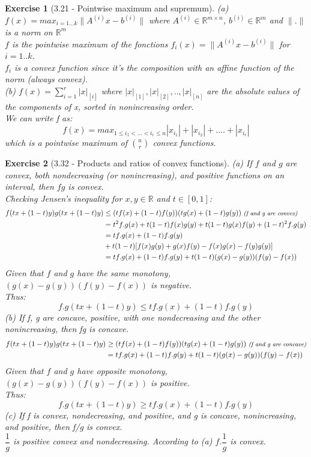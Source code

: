 \documentclass[11pt]{article}
\theoremstyle{exo}
\newtheorem*{exercise}{Exercise}
\newcommand{\R}{\mathbb{R}}
\newcommand{\1}{\mathbf{1}}
\newcommand{\0}{\mathbf{0}}
\begin{document}
\begin{exercise}[3.21 - Pointwise maximum and supremum]
(a) $f(x)=max_{i=1...k}\|A^{(i)}x-b^{(i)}\|$ where $A^{(i)}\in\R^{m\times n}$, $b^{(i)}\in\R^m$ and $\|.\|$ is a norm on $\R^m$\\
$f$ is the pointwise maximum of the fonctions $f_i(x)=\|A^{(i)}x-b^{(i)}\|$ for $i=1..k$.\\
$f_i$ is a convex function since it's the composition with an affine function of the norm (always convex).\\
(b)  $f(x)=\sum\limits_{i=1}^r|x|_{[i]}$ where $|x|_{[1]},|x|_{[2]},..,|x|_{[n]}$ are the absolute values of the components of x, sorted in nonincreasing order.\\
We can write f as:
\[f(x)=max_{1\leq i_1<...<i_r\leq n}|x_{i_1}|+|x_{i_2}|+....+|x_{i_r}|\]
which is a pointwise maximum of $n \choose r$ convex functions.
\end{exercise}

\begin{exercise}[3.32 - Products and ratios of convex functions]
(a) \textit{If $f$ and $g$ are convex, both nondecreasing (or nonincreasing), and positive functions on an interval, then $fg$ is convex.} \\
Checking Jensen's inequality for $x,y\in \R$ and $t\in[0,1]$:
\[
\begin{split}
f(tx+(1-t)y)g(tx+(1-t)y)&\leq(tf(x)+(1-t)f(y))(tg(x)+(1-t)g(y))\text{\footnotesize\textit{    (f and g are convex)}}\\
&=t^2f.g(x)+t(1-t)f(x)g(y)+t(1-t)g(x)f(y)+(1-t)^2f.g(y)\\
&=tf.g(x)+(1-t)f.g(y)\\
&+t(1-t)[f(x)g(y)+g(x)f(y)-f(x)g(x)-f(y)g(y)]\\
&=tf.g(x)+(1-t)f.g(y)+t(1-t)(g(x)-g(y))(f(y)-f(x))
\end{split}
\]
Given that $f$ and $g$ have the same monotony, $(g(x)-g(y))(f(y)-f(x))$ is negative.\\ Thus:
\[
f.g(tx+(1-t)y)\leq tf.g(x)+(1-t)f.g(y) \]
(b) \textit{If f, g are concave, positive, with one nondecreasing and the other nonincreasing, then fg is concave.}\\
\[
\begin{split}
f(tx+(1-t)y)g(tx+(1-t)y)&\geq(tf(x)+(1-t)f(y))(tg(x)+(1-t)g(y))\text{\footnotesize\textit{    (f and g are concave)}}\\
&=tf.g(x)+(1-t)f.g(y)+t(1-t)(g(x)-g(y))(f(y)-f(x))\\
\end{split}
\]
Given that $f$ and $g$ have opposite monotony, $(g(x)-g(y))(f(y)-f(x))$ is positive.\\ Thus:
\[
f.g(tx+(1-t)y)\geq tf.g(x)+(1-t)f.g(y) \]
(c) \textit{If f is convex, nondecreasing, and positive, and g is concave, nonincreasing, and positive, then f/g is convex.}\\
$\dfrac{1}{g}$ is positive convex and nondecreasing. According to (a) $f.\dfrac{1}{g}$ is convex.
\end{exercise}
\end{document}
